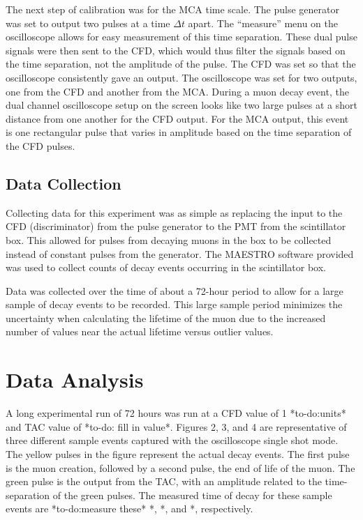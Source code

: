 \documentclass[%
 aip,
 amsmath,amssymb,
 reprint,%
floatfix,
]{revtex4-1}
\begin{document}
The next step of calibration was for the MCA time scale. The pulse generator was set to output two pulses at a time $\Delta t$ apart. The “measure” menu on the oscilloscope allows for easy measurement of this time separation. These dual pulse signals were then sent to the CFD, which would thus filter the signals based on the time separation, not the amplitude of the pulse. The CFD was set so that the oscilloscope consistently gave an output. The oscilloscope was set for two outputs, one from the CFD and another from the MCA. During a muon decay event, the dual channel oscilloscope setup on the screen looks like two large pulses at a short distance from one another for the CFD output. For the MCA output, this event is one rectangular pulse that varies in amplitude based on the time separation of the CFD pulses.

\subsection{Data Collection}

Collecting data for this experiment was as simple as replacing the input to the CFD (discriminator) from the pulse generator to the PMT from the scintillator box. This allowed for pulses from decaying muons in the box to be collected instead of constant pulses from the generator. The MAESTRO software provided was used to collect counts of decay events occurring in the scintillator box.

Data was collected over the time of about a 72-hour period to allow for a large sample of decay events to be recorded. This large sample period minimizes the uncertainty when calculating the lifetime of the muon due to the increased number of values near the actual lifetime versus outlier values.

\section{\label{sec:level4}Data Analysis}

A long experimental run of 72 hours was run at a CFD value of 1 *to-do:units* and TAC value of *to-do: fill in value*. Figures 2, 3, and 4 are representative of three different sample events captured with the oscilloscope single shot mode. The yellow pulses in the figure represent the actual decay events. The first pulse is the muon creation, followed by a second pulse, the end of life of the muon. The green pulse is the output from the TAC, with an amplitude related to the time-separation of the green pulses. The measured time of decay for these sample events are *to-do:measure these* *, *, and *, respectively.
\end{document}
